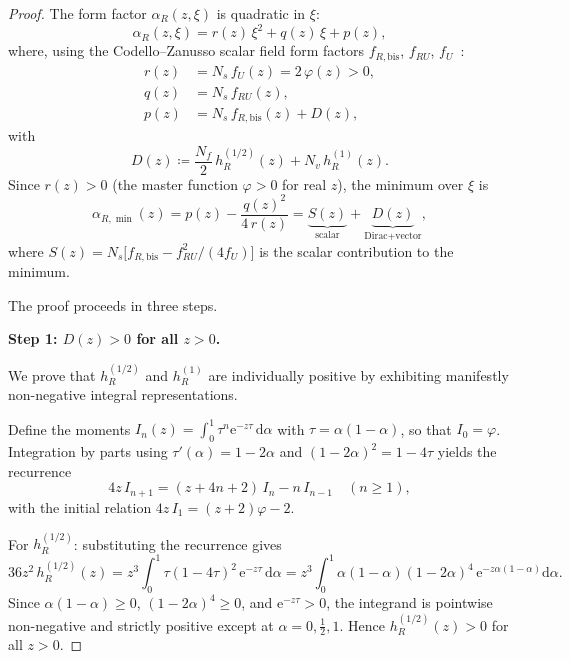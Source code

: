 \documentclass[12pt,a4paper]{article}
\newcommand{\alphaR}{\alpha_R}
\newcommand{\half}{\tfrac{1}{2}}
\newcommand{\dd}{\mathrm{d}}
\newcommand{\ee}{\mathrm{e}}
\begin{document}
\begin{proof}
The form factor $\alphaR(z,\xi)$ is quadratic in $\xi$:
\begin{equation}\label{eq:quadratic}
  \alphaR(z,\xi) = r(z)\,\xi^2 + q(z)\,\xi + p(z),
\end{equation}
where, using the Codello--Zanusso scalar field form factors $f_{R,\mathrm{bis}}$,
$f_{RU}$, $f_U$~\cite{CZ2012}:
\begin{align}
  r(z) &= N_s\,f_U(z) = 2\,\varphi(z) > 0, \label{eq:r} \\
  q(z) &= N_s\,f_{RU}(z), \\
  p(z) &= N_s\,f_{R,\mathrm{bis}}(z) + D(z), \label{eq:p}
\end{align}
with
\begin{equation}\label{eq:D-def}
  D(z) \coloneqq \frac{N_f}{2}\,h_R^{(1/2)}(z) + N_v\,h_R^{(1)}(z).
\end{equation}
Since $r(z) > 0$ (the master function $\varphi > 0$ for real $z$),
the minimum over $\xi$ is
\begin{equation}\label{eq:alpha-min}
  \alpha_{R,\min}(z) = p(z) - \frac{q(z)^2}{4\,r(z)}
  = \underbrace{S(z)}_{\text{scalar}} + \underbrace{D(z)}_{\text{Dirac+vector}},
\end{equation}
where $S(z) = N_s\bigl[f_{R,\mathrm{bis}} - f_{RU}^2/(4f_U)\bigr]$
is the scalar contribution to the minimum.

The proof proceeds in three steps.

\medskip\noindent\textbf{Step 1: $D(z) > 0$ for all $z > 0$.}

We prove that $h_R^{(1/2)}$ and $h_R^{(1)}$ are individually positive
by exhibiting manifestly non-negative integral representations.

Define the moments $I_n(z) = \int_0^1 \tau^n \ee^{-z\tau}\,\dd\alpha$
with $\tau = \alpha(1-\alpha)$, so that $I_0 = \varphi$. Integration by
parts using $\tau'(\alpha) = 1-2\alpha$ and $(1-2\alpha)^2 = 1 - 4\tau$
yields the recurrence
\begin{equation}\label{eq:recurrence}
  4z\,I_{n+1} = (z+4n+2)\,I_n - n\,I_{n-1} \quad (n \geq 1),
\end{equation}
with the initial relation $4z\,I_1 = (z+2)\varphi - 2$.

For $h_R^{(1/2)}$: substituting the recurrence gives
\begin{equation}\label{eq:g-integral}
  36z^2\,h_R^{(1/2)}(z)
  = z^3\!\int_0^1\!\tau(1-4\tau)^2\,\ee^{-z\tau}\,\dd\alpha
  = z^3\!\int_0^1\!\alpha(1\!-\!\alpha)(1\!-\!2\alpha)^4\,\ee^{-z\alpha(1-\alpha)}\dd\alpha.
\end{equation}
Since $\alpha(1-\alpha) \geq 0$, $(1-2\alpha)^4 \geq 0$, and
$\ee^{-z\tau} > 0$, the integrand is pointwise non-negative and
strictly positive except at $\alpha = 0, \half, 1$. Hence
$h_R^{(1/2)}(z) > 0$ for all $z > 0$.


\end{proof}
\end{document}
